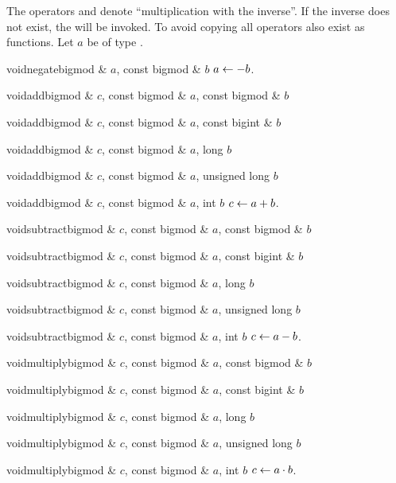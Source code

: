 The operators \code{/} and \code{/=} denote ``multiplication with the inverse''.  If the inverse
does not exist, the \LEH will be invoked.  To avoid copying all operators also exist as
functions.  Let $a$ be of type .

\begin{fcode}{void}{negate}{bigmod & $a$, const bigmod & $b$}
  $a \leftarrow -b$.
\end{fcode}

\begin{fcode}{void}{add}{bigmod & $c$, const bigmod & $a$, const bigmod & $b$}\end{fcode}
\begin{fcode}{void}{add}{bigmod & $c$, const bigmod & $a$, const bigint & $b$}\end{fcode}
\begin{fcode}{void}{add}{bigmod & $c$, const bigmod & $a$, long $b$}\end{fcode}
\begin{fcode}{void}{add}{bigmod & $c$, const bigmod & $a$, unsigned long $b$}\end{fcode}
\begin{fcode}{void}{add}{bigmod & $c$, const bigmod & $a$, int $b$}
  $c \leftarrow a + b$.
\end{fcode}

\begin{fcode}{void}{subtract}{bigmod & $c$, const bigmod & $a$, const bigmod & $b$}\end{fcode}
\begin{fcode}{void}{subtract}{bigmod & $c$, const bigmod & $a$, const bigint & $b$}\end{fcode}
\begin{fcode}{void}{subtract}{bigmod & $c$, const bigmod & $a$, long $b$}\end{fcode}
\begin{fcode}{void}{subtract}{bigmod & $c$, const bigmod & $a$, unsigned long $b$}\end{fcode}
\begin{fcode}{void}{subtract}{bigmod & $c$, const bigmod & $a$, int $b$}
  $c \leftarrow a - b$.
\end{fcode}

\begin{fcode}{void}{multiply}{bigmod & $c$, const bigmod & $a$, const bigmod & $b$}\end{fcode}
\begin{fcode}{void}{multiply}{bigmod & $c$, const bigmod & $a$, const bigint & $b$}\end{fcode}
\begin{fcode}{void}{multiply}{bigmod & $c$, const bigmod & $a$, long $b$}\end{fcode}
\begin{fcode}{void}{multiply}{bigmod & $c$, const bigmod & $a$, unsigned long $b$}\end{fcode}
\begin{fcode}{void}{multiply}{bigmod & $c$, const bigmod & $a$, int $b$}
  $c \leftarrow a \cdot b$.
\end{fcode}

